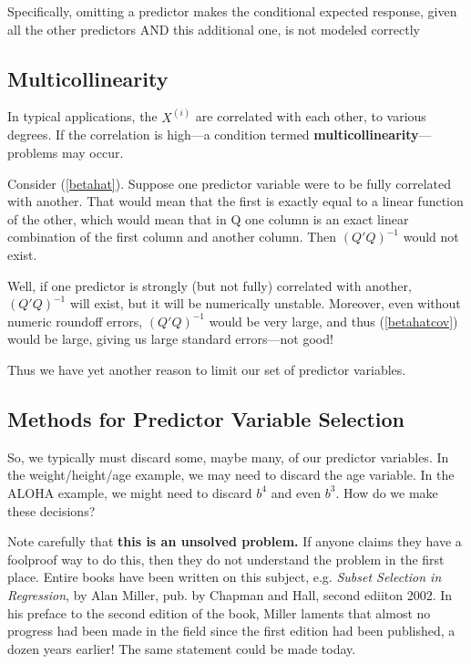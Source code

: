 Specifically, omitting a predictor makes
the conditional expected response, given all the other predictors AND
this additional one, is not modeled correctly

\subsection{Multicollinearity}

In typical applications, the $X^{(i)}$ are correlated with each other,
to various degrees.  If the correlation is high---a condition termed
{\bf multicollinearity}---problems may occur.

Consider (\ref{betahat}).  Suppose one predictor variable were to be
fully correlated with another.  That would mean that the first is
exactly equal to a linear function of the other, which would mean that
in Q one column is an exact linear combination of the first column and
another column.  Then $(Q'Q)^{-1}$ would not exist.

Well, if one predictor is strongly (but not fully) correlated with
another,  $(Q'Q)^{-1}$ will exist, but it will be numerically unstable.
Moreover, even without numeric roundoff errors, $(Q'Q)^{-1}$ would be
very large, and thus (\ref{betahatcov}) would be large, giving us large
standard errors---not good!

Thus we have yet another reason to limit our set of predictor variables.

\subsection{Methods for Predictor Variable Selection}
\label{varsel}

So, we typically must discard some, maybe many, of our predictor
variables.  In the weight/height/age example, we may need to discard the
age variable.  In the ALOHA example, we might need to discard $b^4$ and
even $b^3$.  How do we make these decisions?

Note carefully that {\bf this is an unsolved problem.}  If anyone claims
they have a foolproof way to do this, then they do not understand the
problem in the first place.  Entire books have been written on this
subject, e.g. {\it Subset Selection in Regression}, by Alan Miller, pub.
by Chapman and Hall, second ediiton 2002.  In his preface to the second
edition of the book, Miller laments that almost no progress had been
made in the field since the first edition had been published, a dozen
years earlier!  The same statement could be made today.

